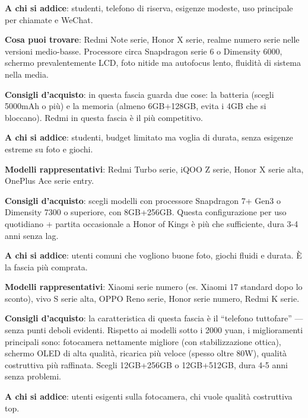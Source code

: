 \textbf{A chi si addice}: studenti, telefono di riserva, esigenze modeste, uso principale per chiamate e WeChat.

\textbf{Cosa puoi trovare}: Redmi Note serie, Honor X serie, realme numero serie nelle versioni medio-basse. Processore circa Snapdragon serie 6 o Dimensity 6000, schermo prevalentemente LCD, foto nitide ma autofocus lento, fluidità di sistema nella media.

\textbf{Consigli d'acquisto}: in questa fascia guarda due cose: la batteria (scegli 5000mAh o più) e la memoria (almeno 6GB+128GB, evita i 4GB che si bloccano). Redmi in questa fascia è il più competitivo.


\textbf{A chi si addice}: studenti, budget limitato ma voglia di durata, senza esigenze estreme su foto e giochi.

\textbf{Modelli rappresentativi}: Redmi Turbo serie, iQOO Z serie, Honor X serie alta, OnePlus Ace serie entry.

\textbf{Consigli d'acquisto}: scegli modelli con processore Snapdragon 7+ Gen3 o Dimensity 7300 o superiore, con 8GB+256GB. Questa configurazione per uso quotidiano + partita occasionale a Honor of Kings è più che sufficiente, dura 3-4 anni senza lag.


\textbf{A chi si addice}: utenti comuni che vogliono buone foto, giochi fluidi e durata. È la fascia più comprata.

\textbf{Modelli rappresentativi}: Xiaomi serie numero (es. Xiaomi 17 standard dopo lo sconto), vivo S serie alta, OPPO Reno serie, Honor serie numero, Redmi K serie.

\textbf{Consigli d'acquisto}: la caratteristica di questa fascia è il “telefono tuttofare” — senza punti deboli evidenti. Rispetto ai modelli sotto i 2000 yuan, i miglioramenti principali sono: fotocamera nettamente migliore (con stabilizzazione ottica), schermo OLED di alta qualità, ricarica più veloce (spesso oltre 80W), qualità costruttiva più raffinata. Scegli 12GB+256GB o 12GB+512GB, dura 4-5 anni senza problemi.


\textbf{A chi si addice}: utenti esigenti sulla fotocamera, chi vuole qualità costruttiva top.

